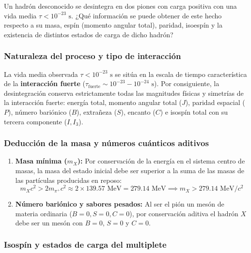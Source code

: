 \newpage
\begin{problema}
Un hadrón desconocido se desintegra en dos piones con carga positiva con una vida media $\tau < 10^{-23} \text{ s}$. ¿Qué información se puede obtener de este hecho respecto a su masa, espín (momento angular total), paridad, isoespín y la existencia de distintos estados de carga de dicho hadrón?
\tcblower
\subsubsection*{Naturaleza del proceso y tipo de interacción}

La vida media observada $\tau < 10^{-23} \text{ s}$ se sitúa en la escala de tiempo característica de la \textbf{interacción fuerte} ($\tau_{\text{fuerte}} \sim 10^{-23} - 10^{-24} \text{ s}$). Por consiguiente, la desintegración conserva estrictamente todas las magnitudes físicas y simetrías de la interacción fuerte: energía total, momento angular total ($J$), paridad espacial ($P$), número bariónico ($B$), extrañeza ($S$), encanto ($C$) e isospín total con su tercera componente ($I, I_3$).

\subsubsection*{Deducción de la masa y números cuánticos aditivos}

\begin{enumerate}[label=\arabic*.]
    \item \textbf{Masa mínima ($m_X$):} Por conservación de la energía en el sistema centro de masas, la masa del estado inicial debe ser superior a la suma de las masas de las partículas producidas en reposo:
    \begin{equation*}
        m_X c^2 > 2 m_{\pi^+} c^2 \approx 2 \times 139.57 \text{ MeV} = 279.14 \text{ MeV} \implies m_X > 279.14 \text{ MeV}/c^2
    \end{equation*}
    \item \textbf{Número bariónico y sabores pesados:} Al ser el pión un mesón de materia ordinaria ($B = 0, S = 0, C = 0$), por conservación aditiva el hadrón $X$ debe ser un mesón con $B = 0$, $S = 0$ y $C = 0$.
\end{enumerate}

\subsubsection*{Isospín y estados de carga del multiplete}


\end{problema}

